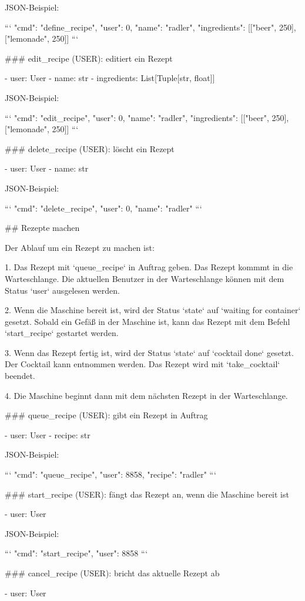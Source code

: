 JSON-Beispiel:

```
{"cmd": "define_recipe", "user": 0, "name": "radler", "ingredients": [["beer", 250], ["lemonade", 250]]}
```

### edit_recipe (USER): editiert ein Rezept

- user: User
- name: str
- ingredients: List[Tuple[str, float]]

JSON-Beispiel:

```
{"cmd": "edit_recipe", "user": 0, "name": "radler", "ingredients": [["beer", 250], ["lemonade", 250]]}
```

### delete_recipe (USER): löscht ein Rezept

- user: User
- name: str

JSON-Beispiel:

```
{"cmd": "delete_recipe", "user": 0, "name": "radler"}
```

## Rezepte machen

Der Ablauf um ein Rezept zu machen ist:

1. Das Rezept mit `queue_recipe` in Auftrag geben. Das Rezept kommmt in die Warteschlange. Die aktuellen Benutzer in der Warteschlange können mit dem Status `user` ausgelesen werden.

2. Wenn die Maschine bereit ist, wird der Status `state` auf `waiting for container` gesetzt. Sobald ein Gefäß in der Maschine ist, kann das Rezept mit dem Befehl `start_recipe` gestartet werden.

3. Wenn das Rezept fertig ist, wird der Status `state` auf `cocktail done` gesetzt. Der Cocktail kann entnommen werden. Das Rezept wird mit `take_cocktail` beendet.

4. Die Maschine beginnt dann mit dem nächsten Rezept in der Warteschlange.


### queue_recipe (USER): gibt ein Rezept in Auftrag

- user: User
- recipe: str

JSON-Beispiel:

```
{"cmd": "queue_recipe", "user": 8858, "recipe": "radler"}
```

### start_recipe (USER): fängt das Rezept an, wenn die Maschine bereit ist

- user: User

JSON-Beispiel:

```
{"cmd": "start_recipe", "user": 8858}
```

### cancel_recipe (USER): bricht das aktuelle Rezept ab

- user: User

